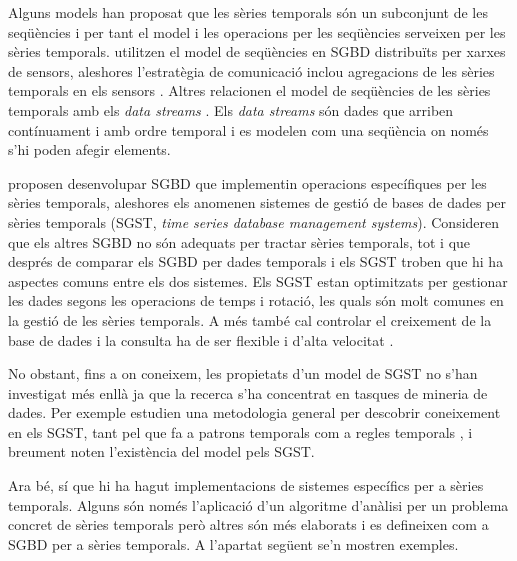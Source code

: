 Alguns models han proposat que les sèries temporals són un subconjunt de les seqüències \parencite{seshadri96:thesis} i per tant el model i les operacions per les seqüències \parencite{seshadri95} serveixen per les sèries temporals. 
\textcite{bonnet01} utilitzen el model de seqüències en SGBD distribuïts per xarxes de sensors, aleshores l'estratègia de comunicació inclou agregacions de les sèries temporals en els sensors \parencite{demers03}.
Altres relacionen el model de seqüències de les sèries temporals amb els \emph{data streams} \parencite{babcock02}. Els \emph{data streams} són dades que arriben contínuament i amb ordre temporal i es modelen com una seqüència on només s'hi poden afegir elements. %



\textcite{dreyer94} proposen desenvolupar SGBD que implementin operacions específiques per les sèries temporals, aleshores els anomenen sistemes de gestió de bases de dades per sèries temporals (SGST, \emph{time series database management systems}). Consideren que els altres SGBD no són adequats per tractar sèries temporals, tot i que després de comparar els SGBD per dades temporals i els SGST \parencite{schmidt95} troben que hi ha aspectes comuns entre els dos sistemes.
Els SGST estan optimitzats per gestionar les dades segons les operacions de temps i rotació, les quals són molt comunes en la gestió de les sèries temporals.  A més també cal controlar el creixement de la base de dades i la consulta ha de ser flexible i d'alta velocitat \parencite{keogh10:isax}. 

No obstant, fins a on coneixem, les propietats d'un model de SGST no s'han investigat més enllà  ja que la recerca s'ha concentrat en tasques de mineria de dades. Per exemple \textcite{last01} estudien una metodologia general per descobrir coneixement en els SGST, tant pel que fa a 
patrons temporals %
com a regles temporals%
, i breument noten l'existència del model \cite{dreyer94} pels SGST.


Ara bé, sí que hi ha hagut implementacions de sistemes específics per a sèries temporals. Alguns són només l'aplicació d'un algoritme d'anàlisi per un problema concret de sèries temporals però  altres  són més elaborats i es defineixen com a SGBD per a sèries temporals. A l'apartat següent se'n mostren exemples. 




